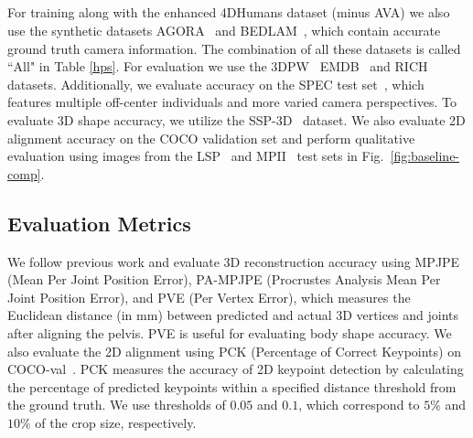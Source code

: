 \subsection{\hpsmodel}


For training \hpsmodel along with the enhanced 4DHumans dataset (minus AVA) we also use the synthetic datasets AGORA~\cite{agora} and BEDLAM~\cite{bedlam}, which contain accurate ground truth camera information. 
The combination of all these datasets is called ``All" in Table \ref{hps}.
For evaluation we use the 3DPW~\cite{3dpw} EMDB~\cite{emdb} and RICH~\cite{rich} datasets. Additionally, we evaluate accuracy on the  SPEC test set~\cite{spec}, which features multiple off-center individuals and more varied camera perspectives. To evaluate 3D shape accuracy, we utilize the SSP-3D~\cite{ssp} dataset. We also evaluate 2D alignment accuracy on the COCO validation set and perform qualitative evaluation using images from the LSP~\cite{lsp} and MPII~\cite{mpii} test sets in 
Fig.~\ref{fig:baseline-comp}.


\subsection{Evaluation Metrics}
We follow previous work \cite{spec, hmr2} and evaluate  3D reconstruction accuracy using MPJPE (Mean Per Joint Position Error), PA-MPJPE (Procrustes Analysis Mean Per Joint Position Error), and PVE (Per Vertex Error), which measures the Euclidean distance (in mm) between predicted and actual 3D vertices and joints after aligning the pelvis. 
PVE is useful for evaluating body shape accuracy.
We also evaluate the 2D alignment using PCK (Percentage of Correct Keypoints) on COCO-val~\cite{coco}. PCK measures the accuracy of 2D keypoint detection by calculating the percentage of predicted keypoints within a specified distance threshold from the ground truth.
We use thresholds of \(0.05\) and \(0.1\), which correspond to \(5\%\) and \(10\%\) of the crop size, respectively. 


\begin{table}
\caption{Vertical field of view error in degrees. BEDLAM-Z stands for the ``zoom" sequence from BEDLAM used for testing (see text). Bold and italics correspond to best and second best respectively.}
\label{fov}
\end{table}


